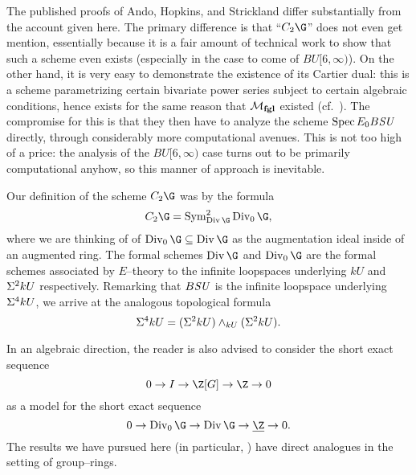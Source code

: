 \begin{remark}\label{CUpper3Exists}
The published proofs of Ando, Hopkins, and Strickland differ substantially from the account given here.  The primary difference is that ``$C_2 \G$'' does not even get mention, essentially because it is a fair amount of technical work to show that such a scheme even exists (especially in the case to come of $BU[6, \infty)$).  On the other hand, it is very easy to demonstrate the existence of its Cartier dual: this is a scheme parametrizing certain bivariate power series subject to certain algebraic conditions, hence exists for the same reason that $\mathcal{M}_{\mathbf{fgl}}$ existed (cf.\ ).  The compromise for this is that they then have to analyze the scheme $\operatorname{Spec} E_0 B\mathit{SU}$ directly, through considerably more computational avenues.  This is not too high of a price: the analysis of the $BU[6, \infty)$ case turns out to be primarily computational anyhow, so this manner of approach is inevitable.
\end{remark}

\begin{remark}
Our definition of the scheme $C_2 \G$ was by the formula \[C_2 \G = \Sym^2_{\Div \G} \Div_0 \G,\] where we are thinking of of $\Div_0 \G \subseteq \Div \G$ as the augmentation ideal inside of an augmented ring.  The formal schemes $\Div \G$ and $\Div_0 \G$ are the formal schemes associated by $E$--theory to the infinite loopspaces underlying $kU$ and $\Sigma^2 kU$ respectively.  Remarking that $B\mathit{SU}$ is the infinite loopspace underlying $\Sigma^4 kU$, we arrive at the analogous topological formula \[\Sigma^4 kU = (\Sigma^2 kU) \wedge_{kU} (\Sigma^2 kU).\]
\end{remark}

\begin{remark}
In an algebraic direction, the reader is also advised to consider the short exact sequence \[0 \to I \to \Z[G] \to \Z \to 0\] as a model for the short exact sequence \[0 \to \Div_0 \G \to \Div \G \to \underline{\Z} \to 0.\]  The results we have pursued here (in particular, ) have direct analogues in the setting of group--rings.
\end{remark}


